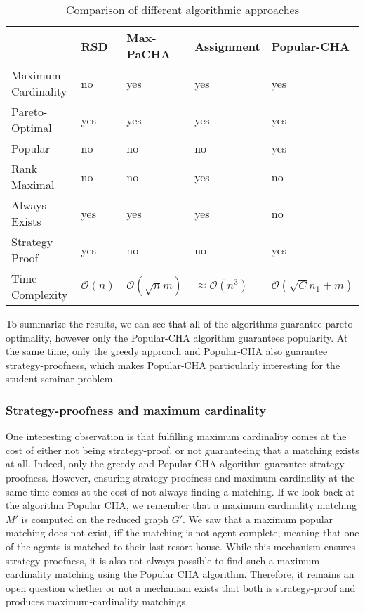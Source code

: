 \begin{table}[h!]
    \begin{tabular}{lllll}
    \hline
                        & RSD    & Max-PaCHA    & Assignment & Popular-CHA           \\ \hline
    Maximum Cardinality & no     & yes          & yes        & yes               \\
    Pareto-Optimal      & yes    & yes          & yes        & yes               \\
    Popular             & no     & no           & no         & yes               \\
    Rank Maximal        & no     & no           & yes        & no                \\
    Always Exists       & yes    & yes          & yes        & no                \\
    Strategy Proof      & yes    & no           & no         & yes               \\ \hline
    Time Complexity     & $\mathcal{O}(n)$   & $\mathcal{O}(\sqrt{n}m)$ & $\approx\mathcal{O}(n^3)$    & $\mathcal{O}(\sqrt{C}n_1 + m)$ \\ \hline
    \end{tabular}
    \caption{Comparison of different algorithmic approaches}
    \label{tab:algorithm-comparison}
\end{table}

To summarize the results, we can see that all of the algorithms guarantee pareto-optimality, however only the Popular-CHA algorithm guarantees popularity. At the same time, only the greedy approach and Popular-CHA also guarantee strategy-proofness, which makes Popular-CHA particularly interesting for the student-seminar problem. 

\subsubsection{Strategy-proofness and maximum cardinality}
One interesting observation is that fulfilling maximum cardinality comes at the cost of either not being strategy-proof, or not guaranteeing that a matching exists at all. Indeed, only the greedy and Popular-CHA algorithm guarantee strategy-proofness. However, ensuring strategy-proofness and maximum cardinality at the same time comes at the cost of not always finding a matching. If we look back at the algorithm Popular CHA, we remember that a maximum cardinality matching $M'$ is computed on the reduced graph $G'$. We saw that a maximum popular matching does not exist, iff the matching is not agent-complete, meaning that one of the agents is matched to their last-resort house. While this mechanism ensures strategy-proofness, it is also not always possible to find such a maximum cardinality matching using the Popular CHA algorithm. Therefore, it remains an open question whether or not a mechanism exists that both is strategy-proof and produces maximum-cardinality matchings.

